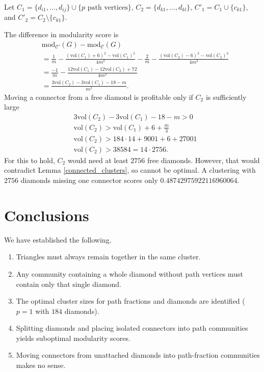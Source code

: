 \documentclass[letterpaper,12pt]{article}
\begin{document}
Let $C_1 = \{d_{i1}, \ldots, d_{ij}\} \cup \{\text{$p$ path vertices}\}$, $C_2 = \{d_{k1}, \ldots, d_{kl}\}$, $C'_1 = C_1 \cup \{c_{k1}\}$, and $C'_2 = C_2 \setminus \{c_{k1}\}$.

The difference in modularity score is
\begin{align*}
       & \text{mod}_{\mathcal{C'}}(G) - \text{mod}_{\mathcal{C}} (G)                                                                                     \\
       & = \frac{1}{m} - \frac{(\text{vol}(C_1)+6)^2 - \text{vol}(C_1)^2}{4m^2} - \frac{2}{m} - \frac{(\text{vol}(C_2) - 6)^2 - \text{vol}(C_2)^2}{4m^2} \\
       & = \frac{-1}{m} - \frac{12\text{vol}(C_1) - 12\text{vol}(C_2) + 72}{4m^2}                                                                        \\
       & = \frac{3\text{vol}(C_2) - 3\text{vol}(C_1) - 18 - m}{m^2}.
\end{align*}
Moving a connector from a free diamond is profitable only if $C_2$ is sufficiently large
\begin{align*}
       & 3\text{vol}(C_2) - 3\text{vol}(C_1) - 18 - m > 0    \\
       & \text{vol}(C_2) > \text{vol}(C_1) + 6 + \frac{m}{3} \\
       & \text{vol}(C_2) > 184 \cdot 14 + 9001 + 6 + 27001   \\
       & \text{vol}(C_2) > 38584 = 14 \cdot 2756.
\end{align*}
For this to hold, $C_2$ would need at least $2756$ free diamonds. However, that would contradict Lemma \ref{connected_clusters}, so cannot be optimal. A clustering with $2756$ diamonds missing one connector scores only $0.48742975922116960064$.

\section{Conclusions}
We have established the following.
\begin{enumerate}
      \item Triangles must always remain together in the same cluster.
      \item Any community containing a whole diamond without path vertices must contain only that single diamond.
      \item The optimal cluster sizes for path fractions and diamonds are identified ($p=1$ with $184$ diamonds).
      \item Splitting diamonds and placing isolated connectors into path communities yields suboptimal modularity scores.
      \item Moving connectors from unattached diamonds into path-fraction communities makes no sense.
\end{enumerate}
\end{document}
